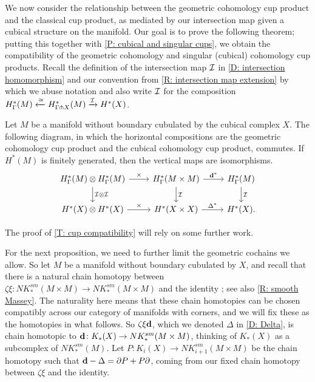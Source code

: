 We now consider the relationship between the geometric cohomology cup product and the classical cup product, as mediated by our intersection map given a cubical structure on the manifold.
Our goal is to prove the following theorem; putting this together with \cref{P: cubical and singular cups}, we obtain the compatibility of the geometric cohomology and singular (cubical) cohomology cup products.
Recall the definition of the intersection map $\mathcal{I}$ in \cref{D: intersection homomorphism} and our convention from \cref{R: intersection map extension} by which we abuse notation and also write $\mathcal{I}$ for the composition $H^*_\Gamma(M) \xleftarrow{\cong} H^*_{\Gamma \pitchfork X}(M) \xrightarrow{\mathcal{I}} H^*(X)$.

\begin{theorem}\label{T: cup compatibility}
Let $M$ be a manifold without boundary cubulated by the cubical complex $X$.
The following diagram, in which the horizontal compositions are the geometric cohomology cup product and the cubical cohomology cup product, commutes.
If $H^*(M)$ is finitely generated, then the vertical maps are isomorphisms.
	\[
	\begin{tikzcd}
	H^*_\Gamma(M) \otimes H^*_\Gamma(M) \arrow[r,"\times"]\arrow[d,"\mc I \otimes \mc I"]& H^*_\Gamma(M \times M) \arrow[d,"\mc I"]\arrow[r,"\diag^*"] & H^*_\Gamma(M) \arrow[d,"\mc I"]\\
	H^*(X) \otimes H^*(X) \arrow[r,"\times"]& H^*(X \times X) \arrow[r,"\Delta^*"] & H^*(X).
	\end{tikzcd}
	\]
\end{theorem}

The proof of \cref{T: cup compatibility} will rely on some further work.

For the next proposition, we need to further limit the geometric cochains we allow.
So let $M$ be a manifold without boundary cubulated by $X$, and recall that there is a natural chain homotopy between $\zeta \xi \colon NK^{sm}_*(M \times M) \to  NK^{sm}_*(M \times M)$ and the identity  \cite[Section XI.5]{Mas91}; see also \cref{R: smooth Massey}.
The naturality here means that these chain homotopies can be chosen compatibly across our category of manifolds with corners, and we will fix these as the homotopies in what follows.
So $\zeta\xi \mathbf{d}$, which we denoted $\Delta$ in \cref{D: Delta}, is chain homotopic to $\mathbf{d} \colon K_*(X) \to NK^{sm}_*(M \times M)$, thinking of $K_*(X)$ as a subcomplex of $NK_*^{sm}(M)$.
Let $P \colon K_i(X) \to NK^{sm}_{i+1}(M \times M)$ be the chain homotopy such that $\mathbf{d} - \Delta = \partial P + P \partial$, coming from our fixed chain homotopy between $\zeta \xi$ and the identity.

